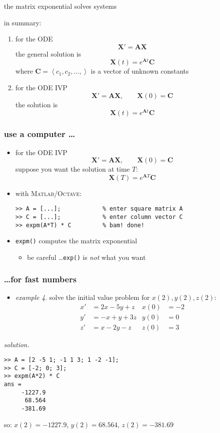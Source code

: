 \documentclass[urlcolor=blue,dvipsnames]{beamer}
\newcommand{\bA}{\mathbf{A}}
\newcommand{\bC}{\mathbf{C}}
\newcommand{\bX}{\mathbf{X}}
\newcommand{\Matlab}{\textsc{Matlab}\xspace}
\newcommand{\Octave}{\textsc{Octave}\xspace}
\begin{document}
\begin{frame}{the matrix exponential solves systems}

\noindent in summary:
\begin{enumerate}
\item for the ODE
    $$\bX' = \bA \bX$$
the general solution is
    $$\bX(t) = e^{\bA t} \bC$$
where $\bC=\left<c_1,c_2,\dots,\right>$ is a vector of unknown constants
\item for the ODE IVP
    $$\bX' = \bA \bX, \qquad \bX(0)=\bC$$
the solution is
    $$\bX(t) = e^{\bA t} \bC$$
\end{enumerate}
\end{frame}


\begin{frame}[fragile]
\frametitle{use a computer \dots}

\begin{itemize}
\item for the ODE IVP
$$\bX' = \bA \bX, \qquad \bX(0)=\bC$$
suppose you want the solution at time $T$:
    $$\bX(T) = e^{\bA T} \bC$$

\medskip
\item with \Matlab/\Octave:
\begin{Verbatim}[fontsize=\small]
>> A = [...];            % enter square matrix A
>> C = [...];            % enter column vector C
>> expm(A*T) * C         % bam! done!
\end{Verbatim}

\medskip
\item \texttt{expm()} computes the matrix exponential
    \begin{itemize}
    \item be careful \dots \texttt{exp()} is \emph{not} what you want
    \end{itemize}
\end{itemize}
\end{frame}


\begin{frame}[fragile]
\frametitle{\dots for fast numbers}

\begin{itemize}
\item \emph{example 4}.  solve the initial value problem for $x(2),y(2),z(2)$:
\begin{align*}
x' &= 2 x - 5 y + z & x(0)&=-2 \\
y' &= - x + y + 3 z & y(0)&=0 \\
z' &= x - 2 y - z   & z(0)&=3
\end{align*}
\end{itemize}

\noindent \emph{solution.}
\begin{Verbatim}[fontsize=\small]
>> A = [2 -5 1; -1 1 3; 1 -2 -1];
>> C = [-2; 0; 3];
>> expm(A*2) * C
ans =
     -1227.9
      68.564
     -381.69
\end{Verbatim}

\medskip
so: \quad $x(2)=-1227.9$, $y(2)=68.564$, $z(2)=-381.69$
\end{frame}
\end{document}
